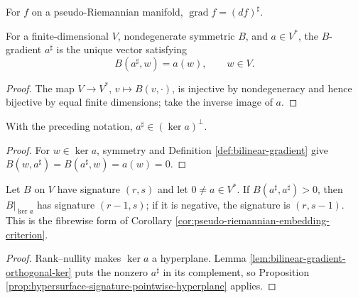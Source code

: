 For $f$ on a pseudo-Riemannian manifold, $\operatorname{grad}f=(df)^\sharp$.

\begin{definition}
\label{def:bilinear-gradient}
\leanok
{}
For a finite-dimensional $V$, nondegenerate symmetric $B$, and $a\in V^*$, the $B$-gradient $a^\sharp$ is the unique vector satisfying
\[
B(a^\sharp,w)=a(w),\qquad w\in V.
\]
\end{definition}
\begin{proof}
\leanok
{}
\sketch The map $V\to V^*$, $v\mapsto B(v,\cdot)$, is injective by nondegeneracy and hence bijective by equal finite dimensions; take the inverse image of $a$.
\end{proof}

\begin{lemma}
\label{lem:bilinear-gradient-orthogonal-ker}
\leanok
{}
With the preceding notation, $a^\sharp\in(\ker a)^\perp$.
\end{lemma}
\begin{proof}
\leanok
{}
\sketch For $w\in\ker a$, symmetry and Definition \ref{def:bilinear-gradient} give $B(w,a^\sharp)=B(a^\sharp,w)=a(w)=0$.
\end{proof}

\begin{proposition}
\label{prop:embedding-criterion-pointwise}
\leanok
{}
Let $B$ on $V$ have signature $(r,s)$ and let $0\ne a\in V^*$. If $B(a^\sharp,a^\sharp)>0$, then $B|_{\ker a}$ has signature $(r-1,s)$; if it is negative, the signature is $(r,s-1)$. This is the fibrewise form of Corollary \ref{cor:pseudo-riemannian-embedding-criterion}.
\end{proposition}
\begin{proof}
\leanok
{}
\sketch Rank--nullity makes $\ker a$ a hyperplane. Lemma \ref{lem:bilinear-gradient-orthogonal-ker} puts the nonzero $a^\sharp$ in its complement, so Proposition \ref{prop:hypersurface-signature-pointwise-hyperplane} applies.
\end{proof}

